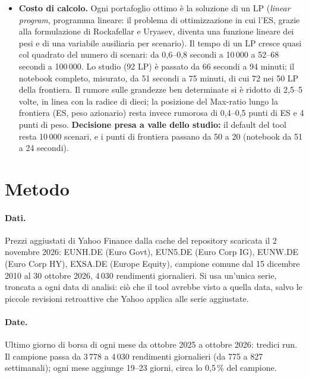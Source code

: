 \documentclass[11pt,a4paper]{article}
\newcommand{\nbTenFifty}{51}
\newcommand{\nbTenTwenty}{24}
\newcommand{\nbHundredFiftyMin}{75}
\begin{document}
\begin{itemize}
\item \textbf{Costo di calcolo.} Ogni portafoglio ottimo \`e la soluzione di un LP (\emph{linear program}, programma lineare: il problema di ottimizzazione in cui l'ES, grazie alla formulazione di Rockafellar e Uryasev, diventa una funzione lineare dei pesi e di una variabile ausiliaria per scenario). Il tempo di un LP cresce quasi col quadrato del numero di scenari: da 0,6--0,8 secondi a 10\,000 a 52--68 secondi a 100\,000. Lo studio (92 LP) \`e passato da 66 secondi a 94 minuti; il notebook completo, misurato, da \nbTenFifty{} secondi a \nbHundredFiftyMin{} minuti, di cui 72 nei 50 LP della frontiera. Il rumore sulle grandezze ben determinate si \`e ridotto di 2,5--5 volte, in linea con la radice di dieci; la posizione del Max-ratio lungo la frontiera (ES, peso azionario) resta invece rumorosa di 0,4--0,5 punti di ES e 4 punti di peso. \textbf{Decisione presa a valle dello studio:} il default del tool resta 10\,000 scenari, e i punti di frontiera passano da 50 a 20 (notebook da \nbTenFifty{} a \nbTenTwenty{} secondi).
\end{itemize}

\section{Metodo}

\paragraph{Dati.} Prezzi aggiustati di Yahoo Finance dalla cache del repository scaricata il 2 novembre 2026: EUNH.DE (Euro Govt), EUN5.DE (Euro Corp IG), EUNW.DE (Euro Corp HY), EXSA.DE (Europe Equity), campione comune dal 15 dicembre 2010 al 30 ottobre 2026, 4\,030 rendimenti giornalieri. Si usa un'unica serie, troncata a ogni data di analisi: ci\`o che il tool avrebbe visto a quella data, salvo le piccole revisioni retroattive che Yahoo applica alle serie aggiustate.

\paragraph{Date.} Ultimo giorno di borsa di ogni mese da ottobre 2025 a ottobre 2026: tredici run. Il campione passa da 3\,778 a 4\,030 rendimenti giornalieri (da 775 a 827 settimanali); ogni mese aggiunge 19--23 giorni, circa lo 0,5\,\% del campione.
\end{document}
